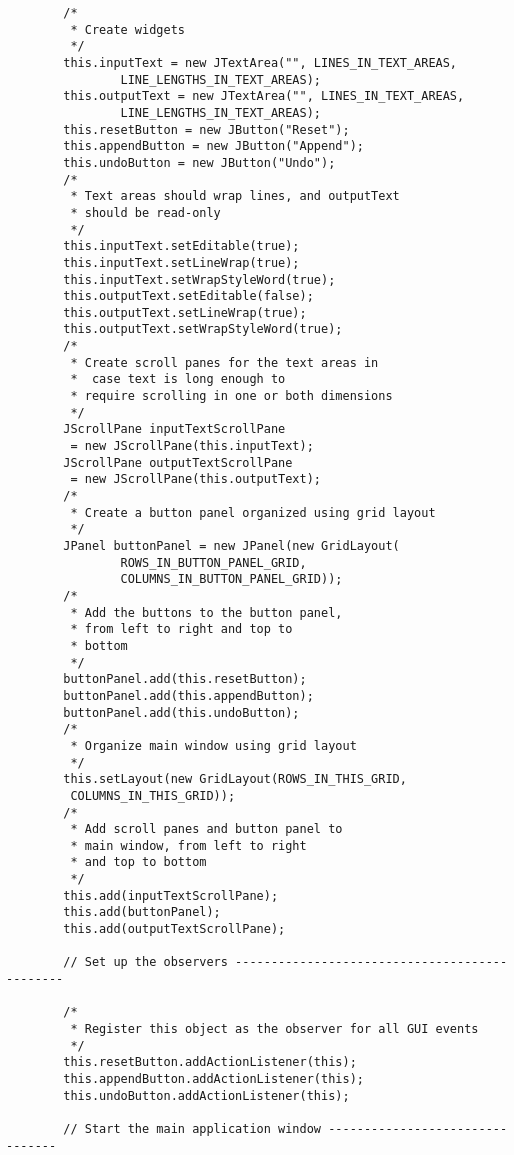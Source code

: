 \documentclass[10pt]{article}
\begin{document}
\begin{lstlisting}
        /*
         * Create widgets
         */
        this.inputText = new JTextArea("", LINES_IN_TEXT_AREAS,
                LINE_LENGTHS_IN_TEXT_AREAS);
        this.outputText = new JTextArea("", LINES_IN_TEXT_AREAS,
                LINE_LENGTHS_IN_TEXT_AREAS);
        this.resetButton = new JButton("Reset");
        this.appendButton = new JButton("Append");
        this.undoButton = new JButton("Undo");
        /*
         * Text areas should wrap lines, and outputText 
         * should be read-only
         */
        this.inputText.setEditable(true);
        this.inputText.setLineWrap(true);
        this.inputText.setWrapStyleWord(true);
        this.outputText.setEditable(false);
        this.outputText.setLineWrap(true);
        this.outputText.setWrapStyleWord(true);
        /*
         * Create scroll panes for the text areas in
         *  case text is long enough to
         * require scrolling in one or both dimensions
         */
        JScrollPane inputTextScrollPane
         = new JScrollPane(this.inputText);
        JScrollPane outputTextScrollPane
         = new JScrollPane(this.outputText);
        /*
         * Create a button panel organized using grid layout
         */
        JPanel buttonPanel = new JPanel(new GridLayout(
                ROWS_IN_BUTTON_PANEL_GRID, 
                COLUMNS_IN_BUTTON_PANEL_GRID));
        /*
         * Add the buttons to the button panel, 
         * from left to right and top to
         * bottom
         */
        buttonPanel.add(this.resetButton);
        buttonPanel.add(this.appendButton);
        buttonPanel.add(this.undoButton);
        /*
         * Organize main window using grid layout
         */
        this.setLayout(new GridLayout(ROWS_IN_THIS_GRID,
         COLUMNS_IN_THIS_GRID));
        /*
         * Add scroll panes and button panel to 
         * main window, from left to right
         * and top to bottom
         */
        this.add(inputTextScrollPane);
        this.add(buttonPanel);
        this.add(outputTextScrollPane);

        // Set up the observers ----------------------------------------------

        /*
         * Register this object as the observer for all GUI events
         */
        this.resetButton.addActionListener(this);
        this.appendButton.addActionListener(this);
        this.undoButton.addActionListener(this);

        // Start the main application window --------------------------------


\end{lstlisting}
\end{document}
